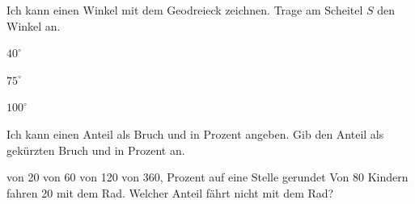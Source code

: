 \begin{aufgabe}{Ich kann einen Winkel mit dem Geodreieck zeichnen.}
Trage am Scheitel $S$ den Winkel an.
\begin{teile}
\teil $40^\circ$
\end{teile}
\winkelstrahl[6]
\begin{teile}
\teil $75^\circ$
\end{teile}
\winkelstrahl[6]
\begin{teile}
\teil $100^\circ$
\end{teile}
\winkelstrahl[6]
\end{aufgabe}

\begin{aufgabe}{Ich kann einen Anteil als Bruch und in Prozent angeben.}
Gib den Anteil als gekürzten Bruch und in Prozent an.
\begin{teile}
 von 20 \hfill \leerfeld \quad \leerfeld[\%]
 von 60 \hfill \leerfeld \quad \leerfeld[\%]
 von 120 \hfill \leerfeld \quad \leerfeld[\%]
 von 360, Prozent auf eine Stelle gerundet \hfill \leerfeld \quad \leerfeld[\%]
\teil Von 80 Kindern fahren 20 mit dem Rad. Welcher Anteil fährt nicht mit dem Rad? \\ \leerfeld \quad \leerfeld[\%]
\end{teile}
\end{aufgabe}
